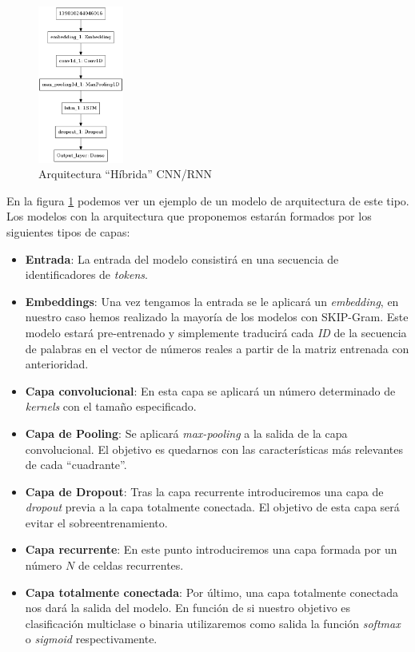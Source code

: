 \begin{figure}[!ht]
	\centering
	\includegraphics[width=0.25\textwidth]{images/super/arq_rnn2}
	\caption{Arquitectura ``Híbrida'' CNN/RNN}
	\label{fig:arqrnn2}
\end{figure}


En la figura \ref{fig:arqrnn2} podemos ver un ejemplo de un modelo de arquitectura de este tipo. Los modelos con la arquitectura que proponemos estarán formados por los siguientes tipos de capas:

 \begin{itemize}
 \item \textbf{Entrada}: La entrada del modelo consistirá en una secuencia de identificadores de \textit{tokens}.
 
  \item \textbf{Embeddings}: Una vez tengamos la entrada se le aplicará un \textit{embedding}, en nuestro caso hemos realizado la mayoría de los modelos con SKIP-Gram. Este modelo estará pre-entrenado y simplemente traducirá cada \textit{ID} de la secuencia de palabras en el vector de números reales a partir de la matriz entrenada con anterioridad. 
  
  \item \textbf{Capa convolucional}: En esta capa se aplicará un número determinado de \textit{kernels} con el tamaño especificado. 
  
 
  
  
  \item \textbf{Capa de Pooling}: Se aplicará \textit{max-pooling} a la salida de la capa convolucional. El objetivo es quedarnos con las características más relevantes de cada ``cuadrante''.
  
  
  \item \textbf{Capa de Dropout}: Tras la capa recurrente introduciremos una capa de \textit{dropout} previa a la capa totalmente conectada. El objetivo de esta capa será evitar el sobreentrenamiento. 
  
  
   \item \textbf{Capa recurrente}: En este punto introduciremos una capa formada por un número $N$ de celdas recurrentes. 
   
  
    \item \textbf{Capa totalmente conectada}: Por último, una capa totalmente conectada nos dará la salida del modelo. En función de si nuestro objetivo es clasificación multiclase o binaria utilizaremos como salida la función \textit{softmax} o \textit{sigmoid} respectivamente.
  
  
 \end{itemize}



